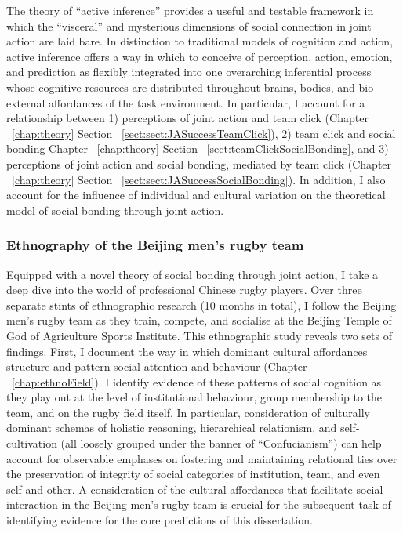 The theory of ``active inference'' \citep{Friston2010} provides a useful and testable framework in which the ``visceral'' and mysterious dimensions of social connection in joint action are laid bare.  In distinction to traditional models of cognition and action, active inference offers a way in which to conceive of perception, action, emotion, and prediction as flexibly integrated into one overarching inferential process whose cognitive resources are distributed throughout brains, bodies, and bio-external affordances of the task environment.  In particular, I account for a relationship between 1) perceptions of joint action and team click (Chapter ~\ref{chap:theory} Section ~\ref{sect:sect:JASuccessTeamClick}), 2) team click and social bonding Chapter ~\ref{chap:theory} Section ~\ref{sect:teamClickSocialBonding}, and 3) perceptions of joint action and social bonding, mediated by team click (Chapter ~\ref{chap:theory} Section ~\ref{sect:sect:JASuccessSocialBonding}).  In addition, I also account for the influence of individual and cultural variation on the theoretical model of social bonding through joint action.

\subsubsection{Ethnography of the Beijing men's rugby team}

Equipped with a novel theory of social bonding through joint action, I take a deep dive into the world of professional Chinese rugby players. Over three separate stints of ethnographic research (10 months in total), I follow the Beijing men's rugby team as they train, compete, and socialise at the Beijing Temple of God of Agriculture Sports Institute.  This ethnographic study reveals two sets of findings.  First, I document the way in which dominant cultural affordances structure and pattern social attention and behaviour  (Chapter ~\ref{chap:ethnoField}).  I identify evidence of these patterns of social cognition as they play out at the level of institutional behaviour, group membership to the team, and on the rugby field itself.  In particular, consideration of culturally dominant schemas of holistic reasoning, hierarchical relationism, and self-cultivation (all loosely grouped under the banner of ``Confucianism'') can help account for observable emphases on fostering and maintaining relational ties over the preservation of integrity of social categories of institution, team, and even self-and-other.  A consideration of the cultural affordances that facilitate social interaction in the Beijing men's rugby team is crucial for the subsequent task of identifying evidence for the core predictions of this dissertation.

